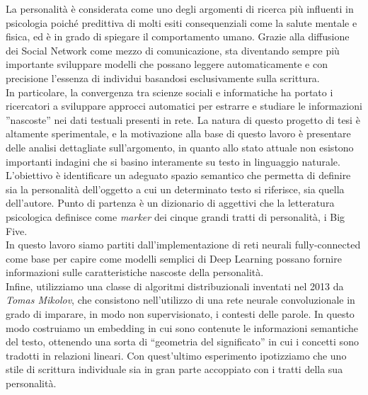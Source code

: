 \documentclass[11pt,twoside]{toptesi}
\begin{document}
La personalità è considerata come uno degli argomenti di ricerca più influenti in psicologia poiché predittiva di molti esiti consequenziali come la salute mentale e fisica, ed è in grado di spiegare il comportamento umano.
Grazie alla diffusione dei Social Network come mezzo di comunicazione, sta diventando sempre più importante sviluppare modelli che possano leggere automaticamente e con precisione l'essenza di individui basandosi esclusivamente sulla scrittura. 
\\
In particolare, la convergenza tra scienze sociali e informatiche ha portato i ricercatori a sviluppare approcci automatici per estrarre e studiare le informazioni ''nascoste'' nei dati testuali presenti in rete.
La natura di questo progetto di tesi è altamente sperimentale, e la motivazione alla base di questo lavoro è presentare delle analisi dettagliate sull'argomento, in quanto allo stato attuale non esistono importanti indagini che si basino interamente su testo in linguaggio naturale.
\\
L'obiettivo è identificare un adeguato spazio semantico che permetta di definire sia la personalità dell'oggetto a cui un determinato testo si riferisce, sia quella dell'autore. Punto di partenza è un dizionario di aggettivi che la letteratura psicologica definisce come \emph{marker} dei cinque grandi tratti di personalità, i Big Five.
\\
In questo lavoro siamo partiti dall'implementazione di reti neurali  fully-connected come base per capire come modelli semplici di Deep Learning possano fornire informazioni sulle caratteristiche nascoste della personalità. 
\\
Infine, utilizziamo una classe di algoritmi distribuzionali inventati nel 2013 da \emph{Tomas Mikolov}, che consistono nell'utilizzo di una rete neurale convoluzionale in grado di imparare, in modo non supervisionato, i contesti delle parole.
In questo modo costruiamo un embedding in cui sono contenute le informazioni semantiche del testo, ottenendo una sorta di “geometria del significato” in cui i concetti sono tradotti in relazioni lineari.
Con quest'ultimo esperimento ipotizziamo che uno stile di scrittura individuale sia in gran parte accoppiato con i tratti della sua personalità.


\tableofcontents

\listoffigures
\end{document}
